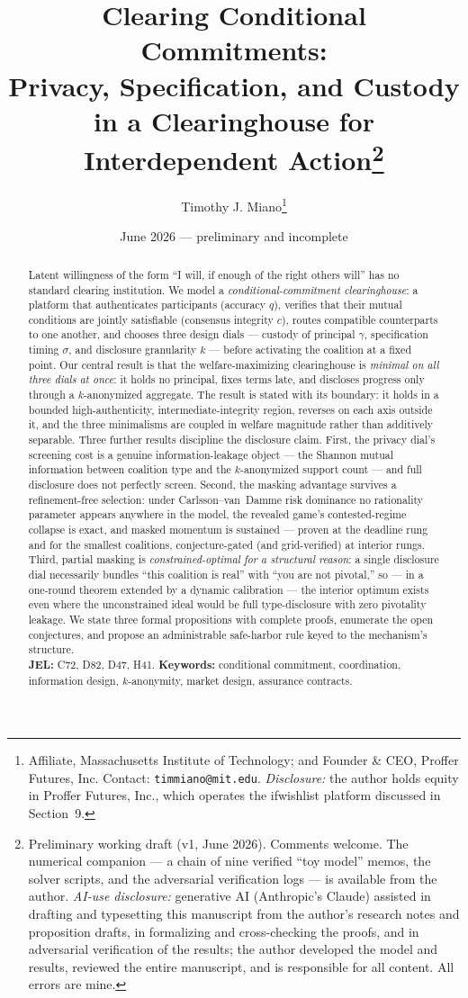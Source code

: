 \documentclass[11pt]{article}
\title{Clearing Conditional Commitments:\\
\large Privacy, Specification, and Custody in a Clearinghouse for Interdependent Action\thanks{%
Preliminary working draft (v1, June 2026). Comments welcome. The numerical companion --- a
chain of nine verified ``toy model'' memos, the solver scripts, and the adversarial
verification logs --- is available from the author. \emph{AI-use disclosure:} generative
AI (Anthropic's Claude) assisted in drafting and typesetting this manuscript from the
author's research notes and proposition drafts, in formalizing and cross-checking the
proofs, and in adversarial verification of the results; the author developed the model and
results, reviewed the entire manuscript, and is responsible for all content. All errors are
mine.}}
\author{Timothy J. Miano\thanks{Affiliate, Massachusetts Institute of Technology; and Founder \& CEO, Proffer Futures, Inc. Contact: \texttt{timmiano@mit.edu}. \emph{Disclosure:} the author holds equity in Proffer Futures, Inc., which operates the ifwishlist platform discussed in Section~9.}}
\date{June 2026 --- preliminary and incomplete}
\theoremstyle{definition}
\theoremstyle{remark}
\begin{document}
\maketitle

\begin{abstract}
\noindent
Latent willingness of the form ``I will, if enough of the right others will'' has no
standard clearing institution. We model a \emph{conditional-commitment clearinghouse}: a platform
that authenticates participants (accuracy $q$), verifies that their mutual conditions are
jointly satisfiable (consensus integrity $c$), routes compatible counterparts to one another,
and chooses three design dials --- custody of principal $\gamma$, specification timing
$\sigma$, and disclosure granularity $k$ --- before activating the coalition at a fixed
point. Our central result is that the welfare-maximizing clearinghouse is \emph{minimal on
all three dials at once}: it holds no principal, fixes terms late, and discloses progress
only through a $k$-anonymized aggregate. The result is stated with its boundary: it holds in
a bounded high-authenticity, intermediate-integrity region, reverses on each axis outside
it, and the three minimalisms are coupled in welfare magnitude rather than additively
separable. Three further results discipline the disclosure claim. First, the privacy dial's
screening cost is a genuine information-leakage object --- the Shannon mutual information
between coalition type and the $k$-anonymized support count --- and full disclosure does not
perfectly screen. Second, the masking advantage survives a refinement-free selection: under
Carlsson--van~Damme risk dominance no rationality parameter appears anywhere in the
model, the revealed game's contested-regime collapse is exact, and masked momentum is
sustained --- proven at the deadline rung and for the smallest coalitions, conjecture-gated
(and grid-verified) at interior rungs. Third, partial
masking is \emph{constrained-optimal for a structural reason}: a single disclosure dial
necessarily bundles ``this coalition is real'' with ``you are not pivotal,'' so --- in a
one-round theorem extended by a dynamic calibration --- the interior optimum exists even
where the unconstrained ideal would be full type-disclosure with zero pivotality leakage. We state three formal propositions with complete proofs, enumerate the
open conjectures, and propose an administrable safe-harbor rule keyed to the mechanism's
structure.\\[4pt]
\textbf{JEL:} C72, D82, D47, H41.\quad
\textbf{Keywords:} conditional commitment, coordination, information design, $k$-anonymity,
market design, assurance contracts.
\end{abstract}
\end{document}
